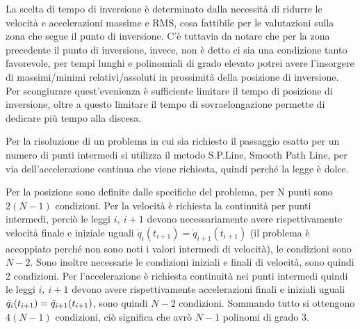 La scelta di tempo di inversione è determinato dalla necessità di ridurre le velocità e accelerazioni massime e RMS, cosa fattibile per le valutazioni sulla zona che segue il punto di inversione. C'è tuttavia da notare che per la zona precedente il punto di inversione, invece, non è detto ci sia una condizione tanto favorevole, per tempi lunghi e polinomiali di grado elevato potrei avere l'insorgere di massimi/minimi relativi/assoluti in prossimità della posizione di inversione. Per scongiurare quest'evenienza è sufficiente limitare il tempo di posizione di inversione, oltre a questo limitare il tempo di sovraelongazione permette di dedicare più tempo alla discesa.

Per la risoluzione di un problema in cui sia richiesto il passaggio esatto per un numero di punti intermedi si utilizza il metodo S.P.Line, Smooth Path Line, per via dell'accelerazione continua che viene richiesta, quindi perché la legge è dolce.

Per la posizione sono definite dalle specifiche del problema, per N punti sono \(2(N-1)\) condizioni. Per la velocità è richiesta la continuità per punti intermedi, perciò le leggi \(i, \ i+1\) devono necessariamente avere rispettivamente velocità finale e iniziale uguali \(\dot{q}_i(t_{i+1})=\dot{q}_{i+1}(t_{i+1})\) (il problema è accoppiato perché non sono noti i valori intermedi di velocità), le condizioni sono \(N-2\). Sono inoltre necessarie le condizioni iniziali e finali di velocità, sono quindi 2 condizioni. Per l'accelerazione è richiesta continuità nei punti intermedi quindi le leggi \(i, \ i+1\) devono avere rispettivamente accelerazioni finali e iniziali uguali \(\Ddot{q}_i(t_{i+1})=\Ddot{q}_{i+1}(t_{i+1})\), sono quindi \(N-2\) condizioni.
Sommando tutto si ottengono \(4(N-1)\) condizioni, ciò significa che avrò \(N-1\) polinomi di grado 3. 


